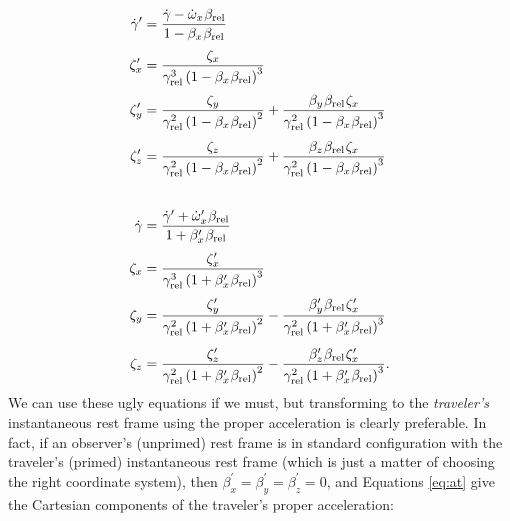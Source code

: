 \documentclass[12pt]{article}
\begin{document}
\begin{equation}\label{eq:at}
\begin{aligned}
\dot{\gamma}^\prime &= \dfrac{\dot{\gamma} - \dot{\omega}_x \mkern1mu \beta_{\textrm{rel}} }{1 - \beta_x \mkern1mu \beta_{\textrm{rel}}} \\[3pt]
\zeta_x^\prime &= \dfrac{\zeta_x}{\gamma_{\textrm{rel}}^3 \left( 1 - \beta_x \mkern1mu \beta_{\textrm{rel}} \right)^3 } \\[3pt]
\zeta_y^\prime &= \dfrac{\zeta_y}{\gamma_{\textrm{rel}}^2 \left( 1 - \beta_x \mkern1mu \beta_{\textrm{rel}} \right)^2 } + \dfrac{\beta_y \mkern1mu \beta_{\textrm{rel}} \mkern1mu \zeta_x}{\gamma_{\textrm{rel}}^2 \left( 1 - \beta_x \mkern1mu \beta_{\textrm{rel}} \right)^3} \\[4pt]
\zeta_z^\prime &= \dfrac{\zeta_z}{\gamma_{\textrm{rel}}^2 \left( 1 - \beta_x \mkern1mu \beta_{\textrm{rel}} \right)^2 } + \dfrac{\beta_z \mkern1mu \beta_{\textrm{rel}} \mkern1mu \zeta_x}{\gamma_{\textrm{rel}}^2 \left( 1 - \beta_x \mkern1mu \beta_{\textrm{rel}} \right)^3} \\[2 em]
\dot{\gamma} &= \dfrac{\dot{\gamma}^\prime + \dot{\omega}^\prime_x \mkern1mu \beta_{\textrm{rel}} }{1 + \beta^\prime_x \mkern1mu \beta_{\textrm{rel}}} \\[3pt]
\zeta_x &= \dfrac{\zeta_x^\prime}{\gamma_{\textrm{rel}}^3 \left( 1 + \beta^{\prime}_x \mkern1mu \beta_{\textrm{rel}} \right)^3 } \\[3pt]
\zeta_y &= \dfrac{\zeta_y^\prime}{\gamma_{\textrm{rel}}^2 \left( 1 + \beta_x^\prime \mkern1mu \beta_{\textrm{rel}} \right)^2 } - \dfrac{\beta_y^\prime \mkern1mu \beta_{\textrm{rel}} \mkern1mu \zeta_x^\prime}{\gamma_{\textrm{rel}}^2 \left( 1 + \beta^{\prime}_x \mkern1mu \beta_{\textrm{rel}} \right)^3} \\[5pt]
\zeta_z &= \dfrac{\zeta_z^\prime}{\gamma_{\textrm{rel}}^2 \left( 1 + \beta_x^\prime \mkern1mu \beta_{\textrm{rel}} \right)^2 } - \dfrac{\beta_z^\prime \mkern1mu \beta_{\textrm{rel}} \mkern1mu \zeta_x^\prime}{\gamma_{\textrm{rel}}^2 \left( 1 + \beta^{\prime}_x \mkern1mu \beta_{\textrm{rel}} \right)^3} .
\end{aligned}
\end{equation}
We can use these ugly equations if we must, but transforming to the \emph{traveler's} instantaneous rest frame using the proper acceleration is clearly preferable. In fact, if an observer's (unprimed) rest frame is in standard configuration with the traveler's (primed) instantaneous rest frame (which is just a matter of choosing the right coordinate system), then $\beta_x^\prime = \beta_y^\prime = \beta_z^\prime = 0$, and Equations \ref{eq:at} give the Cartesian components of the traveler's proper acceleration:
\end{document}
